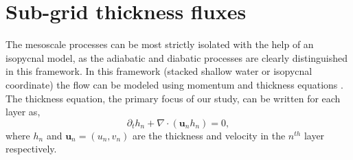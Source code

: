 \documentclass[draft]{agujournal2019}
\begin{document}
\section{Sub-grid thickness fluxes}
The mesoscale processes can be most strictly isolated with the help of an isopycnal model, as the adiabatic and diabatic processes are clearly distinguished in this framework.
In this framework (stacked shallow water or isopycnal coordinate) the flow can be modeled using momentum and thickness equations \citep[e.g.][]{vallis2017atmospheric, loose2023comparing}. The thickness equation, the primary focus of our study, can be written for each layer as, 
\begin{equation}
    \partial_t h_n + \nabla \cdot (\mathbf{u}_n h_n) = 0,
\end{equation}
where $h_n$ and $\mathbf{u}_n = (u_n, v_n)$ are the thickness and velocity in the $n^{th}$ layer respectively.%
\end{document}
